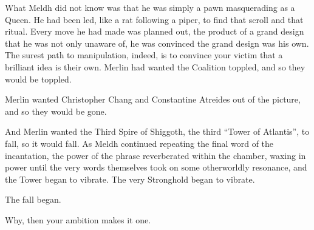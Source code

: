 What Meldh did not know was that he was simply a pawn masquerading as a Queen. He had been led, like a rat following a piper, to find that scroll and that ritual. Every move he had made was planned out, the product of a grand design that he was not only unaware of, he was convinced the grand design was his own. The surest path to manipulation, indeed, is to convince your victim that a brilliant idea is their own.
\SmallVSpace
Merlin had wanted the Coalition toppled, and so they would be toppled.

Merlin wanted Christopher Chang and Constantine Atreides out of the picture, and so they would be gone.

And Merlin wanted the Third Spire of Shiggoth, the third “Tower of Atlantis”, to fall, so it would fall.
\SmallVSpace
As Meldh continued repeating the final word of the incantation, the power of the phrase reverberated within the chamber, waxing in power until the very words themselves took on some otherworldly resonance, and the Tower began to vibrate. The very Stronghold began to vibrate.

The fall began.

\simpleline



{Why, then your ambition makes it one.}


